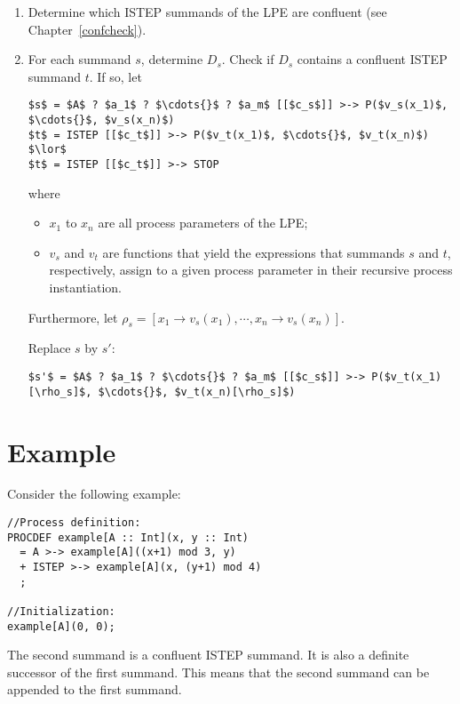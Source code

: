 \begin{enumerate}

\item Determine which ISTEP summands of the LPE are confluent (see Chapter~\ref{confcheck}).

\item For each summand $s$, determine $D_s$.
Check if $D_s$ contains a confluent ISTEP summand $t$.
If so, let

\begin{lstlisting}[mathescape]
$s$ = $A$ ? $a_1$ ? $\cdots{}$ ? $a_m$ [[$c_s$]] >-> P($v_s(x_1)$, $\cdots{}$, $v_s(x_n)$)
$t$ = ISTEP [[$c_t$]] >-> P($v_t(x_1)$, $\cdots{}$, $v_t(x_n)$)
$\lor$
$t$ = ISTEP [[$c_t$]] >-> STOP
\end{lstlisting}

where

\begin{itemize}
\item $x_1$ to $x_n$ are all process parameters of the LPE;
\item $v_s$ and $v_t$ are functions that yield the expressions that summands $s$ and $t$, respectively, assign to a given process parameter in their recursive process instantiation.
\end{itemize}

Furthermore, let $\rho_s = [x_1 \rightarrow v_s(x_1), \cdots{}, x_n \rightarrow v_s(x_n)]$.

Replace $s$ by $s'$:

\begin{lstlisting}[mathescape]
$s'$ = $A$ ? $a_1$ ? $\cdots{}$ ? $a_m$ [[$c_s$]] >-> P($v_t(x_1)[\rho_s]$, $\cdots{}$, $v_t(x_n)[\rho_s]$)
\end{lstlisting}

\end{enumerate}

\clearpage
\section{Example}

Consider the following example:

\begin{lstlisting}
//Process definition:
PROCDEF example[A :: Int](x, y :: Int)
  = A >-> example[A]((x+1) mod 3, y)
  + ISTEP >-> example[A](x, (y+1) mod 4)
  ;

//Initialization:
example[A](0, 0);
\end{lstlisting}

The second summand is a confluent ISTEP summand.
It is also a definite successor of the first summand.
This means that the second summand can be appended to the first summand.

